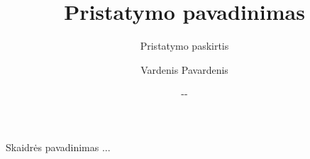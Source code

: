 \documentclass{beamer}
\title{Pristatymo pavadinimas}
\subtitle{Pristatymo paskirtis}
\author{Vardenis Pavardenis}
\institute[]{}
\date{\small \the\year-\the\month-\the\day}
\begin{document}
\begin{frame}
  \titlepage
\end{frame}


\begin{frame}[fragile]{Skaidrės pavadinimas}
    ...
\end{frame}
\end{document}
